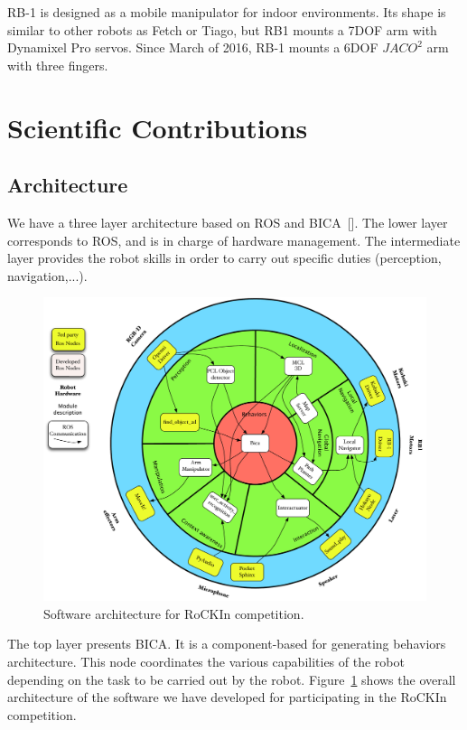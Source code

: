 \documentclass[citeauthoryear]{llncs}
\begin{document}
RB-1 is designed as a mobile manipulator for indoor environments. Its shape is similar to other robots as Fetch or Tiago, but RB1 mounts a 7DOF arm with Dynamixel Pro servos.
Since March of 2016, RB-1 mounts a 6DOF $JACO^2$ arm with three fingers. 

\section{Scientific Contributions}

\subsection{Architecture}

We have a three layer architecture based on ROS and {BICA}~[\cite{aguero2010behavior}]. 
The lower layer corresponds to ROS, and is in charge of hardware management. 
The intermediate layer provides the robot skills in order to carry out specific duties (perception, navigation,...).

\begin{figure}[ht]
  \centering
  \includegraphics[width=\textwidth]{rokinarq}
  \caption{Software architecture for RoCKIn competition.} 
  \label{fig:architecture}
\end{figure}

The top layer presents {BICA}. It is a component-based for generating behaviors architecture. This node coordinates the various
capabilities of the robot depending on the task to be carried out by the robot.
Figure~\ref{fig:architecture} shows the overall architecture of the software we have developed for participating in the RoCKIn competition. 
\end{document}
